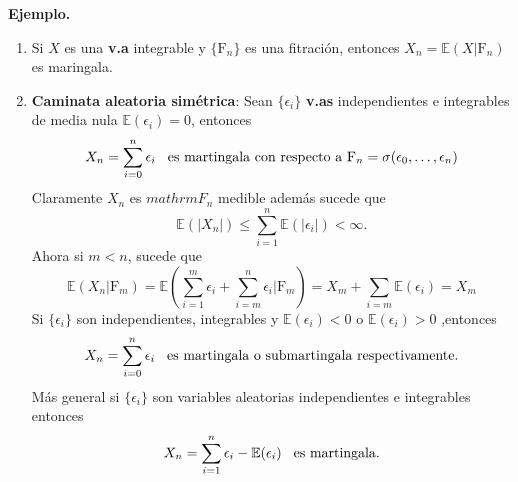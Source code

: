 \documentclass[letterpaper]{article}
\newcommand{\esp}{\mathbb E}
\newcommand{\eje}{{\newline \noindent \sc \textbf{Ejemplo. }}}
\begin{document}
\eje
\begin{enumerate}
\item Si \(X\) es una \textbf{v.a} integrable y \(\{\mathrm{F}_n\}\) es una fitración, entonces \(X_n=\esp(X|\mathrm{F}_n)\) es maringala.
\item \textbf{Caminata aleatoria simétrica}: Sean \(\{\epsilon_i\}\) \textbf{v.as} independientes e integrables de media nula \(\esp(\epsilon_i)=0\), entonces
  \[
        X_n=\sum_{i=0}^{n}\epsilon_i\hspace{0.3cm}\text{es martingala con respecto a } \mathrm{F}_n=\sigma(\epsilon_0,\dots,\epsilon_n)
   \]
  Claramente \(X_n\) es \(mathrm{F}_n\) medible además sucede que
  \[
        \esp(|X_n|)\leq\sum_{i=1}^{n}\esp(|\epsilon_i|)<\infty.
   \]
Ahora si \(m<n\), sucede que
   \[
         \esp(X_n|\mathrm{F}_m)=\esp(\sum_{i=1}^m\epsilon_i+\sum_{i=m}^n\epsilon_i|\mathrm{F}_m)=X_m+\sum_{i=m}\esp(\epsilon_i)=X_m
    \]
Si \(\{\epsilon_i\}\) son independientes, integrables y \(\esp(\epsilon_i)<0\) o \(\esp(\epsilon_i)>0\) ,entonces
\[
    X_n=\sum_{i=0}^n\epsilon_i\hspace{0.3cm}\text{es martingala o submartingala respectivamente}.
 \]
\noindent Más general si \(\{\epsilon_i\}\) son variables aleatorias independientes e integrables entonces
\[
    X_n=\sum_{i=1}^n\epsilon_i-\esp(\epsilon_i)\hspace{0.3cm}\text{es martingala}.
 \]


\end{enumerate}
\end{document}

